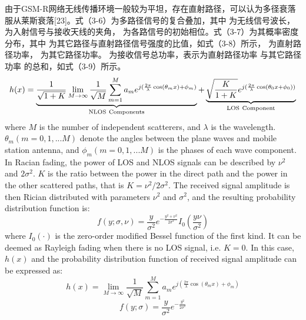 由于GSM-R网络无线传播环境一般较为平坦，存在直射路径，可以认为多径衰落 服从莱斯衰落[23]。式（3-6）为多路径信号的复合叠加，其中 为无线信号波长， 为入射信号与接收天线的夹角， 为各路信号的初始相位。式（3-7）为其概率密度分布，其中 为其它路径与直射路径信号强度的比值，如式（3-8）所示， 为直射路径功率， 为其它路径功率。 为接收信号总功率，表示为直射路径功率 与其它路径功率 的总和，如式（3-9）所示。
\begin{equation}
  h(x)=\underbrace{\frac{1}{\sqrt{1+K}}\lim_{M \to \infty}\frac{1}{\sqrt M}\sum_{m=1}^{M}a_{m}e^{j(\frac{2\pi}{\lambda}\cos(\theta_{m}x)+\phi_m)}}_{\rm NLOS~Components}
  +\underbrace{\sqrt{\frac{K}{1+K}}e^{j(\frac{2\pi}{\lambda}\cos(\theta_{0}x+ \phi_0))}}_{\rm LOS~Component}
\label{rician1}
\end{equation}
where $M$ is the number of independent scatterers, and $\lambda$ is the wavelength. $\theta_m(m=0,1,...M)$ denote the angles between the plane waves and mobile station antenna, and $\phi_m(m=0,1,...M)$ is the phases of each wave component. In Racian fading, the power of LOS and NLOS signals can be described by $\nu^2$ and $2\sigma^2$. $K$ is the ratio between the power in the direct path and the power in the other scattered paths, that is $K=\nu^2/2\sigma^2$. The received signal amplitude is then Rician distributed with parameters $\nu^2$ and $\sigma^2$, and the resulting probability distribution function is:
\begin{equation}
    f(y;\sigma,\nu)=\frac{y}{\sigma^2}e^{-\frac{y^2+\nu^2}{2\sigma^2}}I_0\left(\frac{y\nu}{\sigma^2}\right)
\label{ricianPDF}
\end{equation}
where $I_0(\cdot)$ is the zero-order modified Bessel function of the first kind.
It can be deemed as Rayleigh fading when there is no LOS signal, i.e. $K=0$. In this case, $h(x)$ and the probability distribution function of received signal amplitude can be expressed as:
\begin{equation}
    h(x)=\lim_{M \to \infty}\frac{1}{\sqrt M}\sum_{m=1}^{M}a_{m}e^{j\left(\frac{2\pi}{\lambda}\cos(\theta_{m}x)+\phi_m\right)}
\label{rayleigh}
\end{equation}
\begin{equation}
    f(y;\sigma)=\frac{y}{\sigma^2}e^{-\frac{y^2}{2\sigma^2}}
\label{rayleighPDF}
\end{equation}


